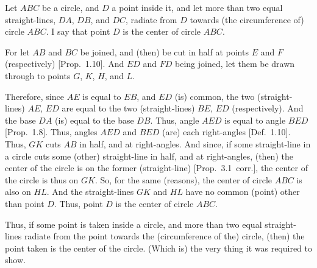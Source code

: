 \begin{Parallel}{}{}
{Let $ABC$ be a circle, and $D$ a point inside it, and let more than two equal
straight-lines, $DA$, $DB$, and $DC$, radiate from $D$ towards (the circumference of) circle
$ABC$. I say that point $D$ is the center of circle $ABC$.

\epsfysize=2.2in
\centerline{}

For let $AB$ and $BC$ be joined, and (then) be cut in half at points $E$ and $F$ 
(respectively) [Prop.~1.10]. And $ED$ and $FD$ being joined, let them be
drawn through to points $G$, $K$, $H$, and $L$.

Therefore, since $AE$ is equal to $EB$, and $ED$ (is) common, the two (straight-lines) $AE$, $ED$ are equal to the two (straight-lines) $BE$, $ED$ (respectively). And the 
base $DA$ (is) equal to the base $DB$. Thus, angle $AED$ is equal to
angle $BED$ [Prop.~1.8]. Thus, angles $AED$ and $BED$ (are) each right-angles [Def.~1.10]. Thus, $GK$ cuts $AB$ in half, and at right-angles. And since,
if some straight-line in a circle cuts some (other) straight-line in half,
and at right-angles, (then) the center of the circle is on the former (straight-line)
[Prop.~3.1~corr.], the center of the circle is thus on $GK$. So, for the
same (reasons), the center of circle $ABC$ is also on $HL$. And the straight-lines
$GK$ and $HL$ have no  common (point) other than point $D$. Thus, point
$D$ is the center of circle $ABC$.

Thus, if some point is taken inside a circle, and more than two equal straight-lines
radiate from the point towards the (circumference of the) circle, (then) the
point taken  is the center of the circle. (Which is) the very thing it was
required to show.}
\end{Parallel}

